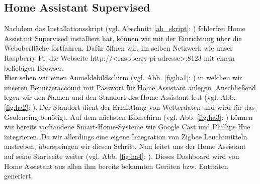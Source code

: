 \subsection{Home Assistant Supervised}\label{sw_hassio}
Nachdem das Installationsskript (vgl. Abschnitt \ref{ah_skript}: ) fehlerfrei Home Assistant Supervised installiert hat, können wir mit der Einrichtung über die Weboberfläche fortfahren. 
Dafür öffnen wir, im selben Netzwerk wie unser Raspberry Pi, die Webseite http://<raspberry-pi-adresse>:8123 mit einem beliebigen Browser.\\
\noindent Hier sehen wir einen Anmeldebildschirm (vgl. Abb. \ref{fig:ha1}: ) in welchen wir unseren Benutzeraccount mit Passwort für Home Assistant anlegen. 
Anschließend legen wir den Namen und den Standort des Home Assistant fest (vgl. Abb. \ref{fig:ha2}: ). 
Der Standort dient der Ermittlung von Wetterdaten und wird für das Geofencing benötigt. 
Auf dem nächsten Bildschirm (vgl. Abb. \ref{fig:ha3}: ) können wir bereits vorhandene Smart-Home-Systeme wie Google Cast und Phillips Hue integrieren. 
Da wir allerdings eine eigene Integration von Zigbee Leuchtmitteln anstreben, überspringen wir diesen Schritt. 
Nun leitet uns der Home Assistant auf seine Startseite weiter (vgl. Abb. \ref{fig:ha4}: ). 
Dieses Dashboard wird von Home Assistant aus allen ihm bereits bekannten Geräten bzw. Entitäten generiert. 
